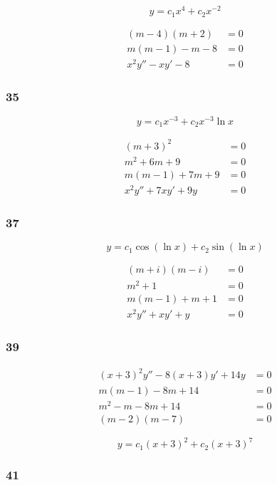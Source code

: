\documentclass{article}
\begin{document}
\[y = c_1 x^4 + c_2 x^{-2}\]

\begin{align*}
  (m - 4) (m + 2)    & = 0 \\
  m (m - 1) - m - 8  & = 0 \\
  x^2 y'' - x y' - 8 & = 0
\end{align*}

\subsubsection{35}

\[y = c_1 x^{-3} + c_2 x^{-3} \ln x\]

\begin{align*}
  (m + 3)^2             & = 0 \\
  m^2 + 6m + 9          & = 0 \\
  m (m - 1) + 7m + 9    & = 0 \\
  x^2 y'' + 7 x y' + 9y & = 0
\end{align*}

\subsubsection{37}

\[y = c_1 \cos (\ln x) + c_2 \sin (\ln x)\]

\begin{align*}
  (m + i) (m - i)    & = 0 \\
  m^2 + 1            & = 0 \\
  m (m - 1) + m + 1  & = 0 \\
  x^2 y'' + x y' + y & = 0
\end{align*}

\subsubsection{39}

\begin{align*}
  (x + 3)^2 y'' - 8 (x + 3) y' + 14y & = 0 \\
  m (m - 1) - 8 m + 14               & = 0 \\
  m^2 - m - 8m + 14                  & = 0 \\
  (m - 2) (m - 7)                    & = 0
\end{align*}

\[y = c_1 (x + 3)^2 + c_2 (x + 3)^7\]

\subsubsection{41}
\end{document}
